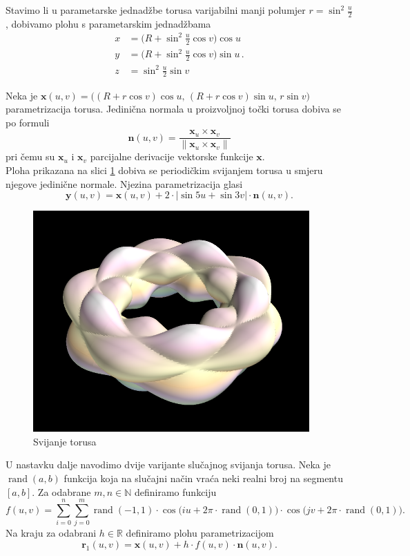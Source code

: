 \documentclass[a4paper,12pt]{article}
\theoremstyle{zad}
\DeclareMathOperator{\rand}{\mathrm{rand}}
\begin{document}
\noindent Stavimo li u parametarske jednad\v{z}be torusa varijabilni manji polumjer $r=\sin^2{\frac{u}{2}}$, dobivamo plohu s parametarskim jednad\v{z}bama
\begin{align*}
x&=\big(R+\sin^2{\tfrac{u}{2}}\cos{v}\big)\cos{u}\\[2pt]
y&=\big(R+\sin^2{\tfrac{u}{2}}\cos{v}\big)\sin{u}\,.\\[2pt]
z&=\sin^2{\tfrac{u}{2}}\sin{v}
\end{align*}

\noindent Neka je $\mathbf{x}(u,v)=\big((R+r\cos{v})\cos{u},\,(R+r\cos{v})\sin{u},\,r\sin{v}\big)$ parametrizacija torusa.\vspace*{2pt} Jedini\v{c}na normala u proizvoljnoj to\v{c}ki torusa dobiva se po formuli
$$\mathbf{n}(u,v)=\frac{\mathbf{x}_u\times\mathbf{x}_v}{\|\mathbf{x}_u\times\mathbf{x}_v\|}$$
pri čemu su $\mathbf{x}_u$ i $\mathbf{x}_v$ parcijalne derivacije vektorske funkcije $\mathbf{x}$.\\[5pt]
Ploha prikazana na slici \ref{sl3} dobiva se periodi\v{c}kim svijanjem torusa u smjeru njegove jedini\v{c}ne normale. Njezina parametrizacija glasi
$$\mathbf{y}(u,v)=\mathbf{x}(u,v)+2\cdot|\sin{5u}+\sin{3v}|\cdot\mathbf{n}(u,v).$$

\begin{figure}[!h]
\centering
\includegraphics[scale=0.35]{sv_torus3.png}
\vspace*{-5pt}
\caption{Svijanje torusa}\label{sl3}
\end{figure}

\noindent U nastavku dalje navodimo dvije varijante slu\v{c}ajnog svijanja torusa. 
Neka je $\rand(a,b)$ funkcija koja na slu\v{c}ajni na\v{c}in vra\'ca neki realni broj na segmentu $[a,b]$. Za odabrane $m,n\in\mathbb{N}$ def\mbox{}iniramo funkciju
$$f(u,v)=\sum_{i=0}^n\sum_{j=0}^m{\rand(-1,1)\cdot\cos{\big(iu+2\pi\cdot\rand(0,1)\big)}\cdot\cos{\big(jv+2\pi\cdot\rand(0,1)\big)}}.$$
Na kraju za odabrani $h\in\mathbb{R}$ def\mbox{}iniramo plohu parametrizacijom
$$\mathbf{r}_1(u,v)=\mathbf{x}(u,v)+h\cdot f(u,v)\cdot\mathbf{n}(u,v).$$
\end{document}
